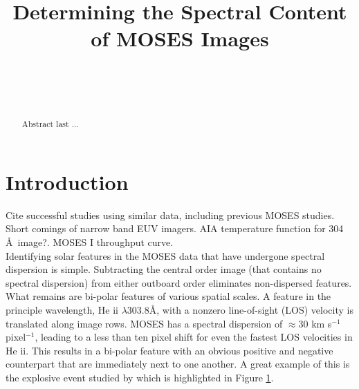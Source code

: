 \documentclass[]{solarphysics}
\begin{document}
\begin{article}
\begin{opening}

\title{Determining the Spectral Content of MOSES Images}

\author[addressref={aff1},corref,email={jacob.parker3@montana.edu}]{~}%
\author[addressref=aff1,email={Want to include your email Charles?}]{~}%
\address[id=aff1]{Montana State University}


\begin{abstract}
Abstract last ...
\end{abstract}
\end{opening}

\section{Introduction}

	
	
	Cite successful studies using similar data, including previous MOSES studies. \\ 
	
	Short comings of narrow band EUV imagers.  AIA temperature function for 304 \AA \ image?.  MOSES I throughput curve. \\
	
	Identifying solar features in the MOSES data that have undergone spectral dispersion is simple. Subtracting the central order image (that contains no spectral dispersion) from either outboard order eliminates non-dispersed features. What remains are bi-polar features of various spatial scales.  A feature in the principle wavelength, He {\sc ii} $\lambda 303.8$\AA, with a nonzero line-of-sight (LOS) velocity is translated along image rows.    MOSES has a spectral dispersion of $\approx 30$ km s$^{-1}$ pixel$^{-1}$, leading to a less than ten pixel shift for even the fastest LOS velocities in He {\sc ii}. 
	This results in a bi-polar feature with an obvious positive and negative counterpart that are immediately next to one another. A great example of this is the explosive event studied by \citet{Fox2010} which is highlighted in Figure \ref{}.
	

\end{article}
\end{document}
